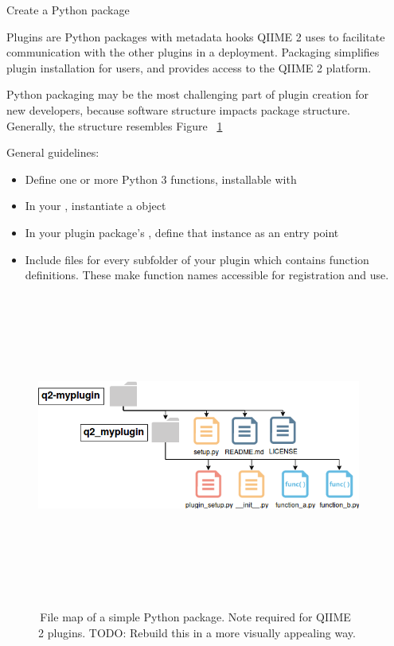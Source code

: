 \documentclass[final]{beamer}
\newlength{\sepwidth}
\newlength{\colwidth}
\newcommand{\separatorcolumn}{\begin{column}{\sepwidth}\end{column}}
\begin{document}
\begin{frame}[t]
\begin{columns}[t]
\separatorcolumn

\begin{column}{\colwidth}

  \begin{block}{Create a Python package}

    Plugins are Python packages with metadata hooks QIIME 2 uses to facilitate
    communication with the other plugins in a deployment. Packaging
    simplifies plugin installation for users, and provides access to the QIIME 2 platform.

    \begin{tcolorbox}
    [width=\textwidth, colframe=blue]
    {Python packaging may be the most challenging part of plugin creation
    for new developers, because software structure impacts package structure.
    Generally, the structure resembles Figure ~\ref{fig:packageStructure}}
    \end{tcolorbox}

    General guidelines:
    \begin{itemize}
      \item Define one or more Python 3 functions, installable with 
      \item In your , instantiate a  object
      \item In your plugin package's , define that instance as an entry point
      \item Include  files for every subfolder of your plugin which
      contains function definitions. These make function names accessible for registration and use.
    \end{itemize}
  \end{block}

  \begin{figure}[tph!]
    {\includegraphics[height=10cm]{assets/packageStructure}}
    \caption{\,File map of a simple Python package. Note  required for QIIME 2 plugins.
    TODO: Rebuild this in a more visually appealing way.}
    \label{fig:packageStructure}
  \end{figure}


\end{column}
\end{columns}
\end{frame}
\end{document}
